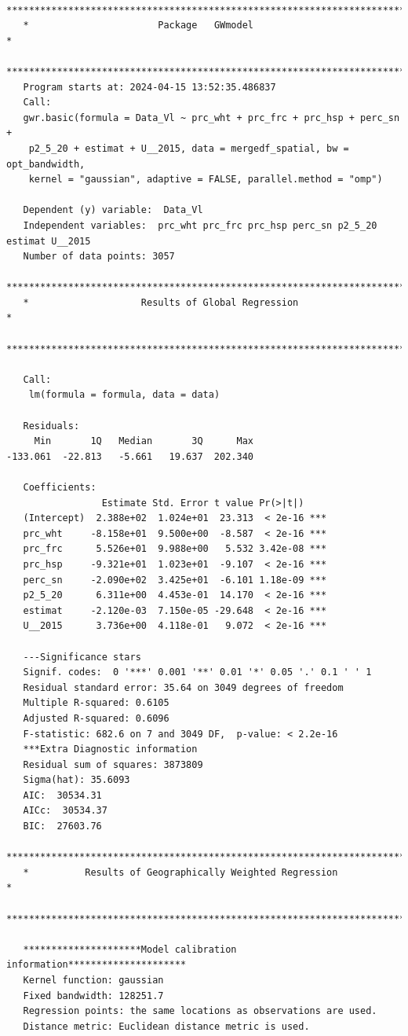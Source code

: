 \documentclass[
]{article}
\begin{document}
\begin{verbatim}
   ***********************************************************************
   *                       Package   GWmodel                             *
   ***********************************************************************
   Program starts at: 2024-04-15 13:52:35.486837 
   Call:
   gwr.basic(formula = Data_Vl ~ prc_wht + prc_frc + prc_hsp + perc_sn + 
    p2_5_20 + estimat + U__2015, data = mergedf_spatial, bw = opt_bandwidth, 
    kernel = "gaussian", adaptive = FALSE, parallel.method = "omp")

   Dependent (y) variable:  Data_Vl
   Independent variables:  prc_wht prc_frc prc_hsp perc_sn p2_5_20 estimat U__2015
   Number of data points: 3057
   ***********************************************************************
   *                    Results of Global Regression                     *
   ***********************************************************************

   Call:
    lm(formula = formula, data = data)

   Residuals:
     Min       1Q   Median       3Q      Max 
-133.061  -22.813   -5.661   19.637  202.340 

   Coefficients:
                 Estimate Std. Error t value Pr(>|t|)    
   (Intercept)  2.388e+02  1.024e+01  23.313  < 2e-16 ***
   prc_wht     -8.158e+01  9.500e+00  -8.587  < 2e-16 ***
   prc_frc      5.526e+01  9.988e+00   5.532 3.42e-08 ***
   prc_hsp     -9.321e+01  1.023e+01  -9.107  < 2e-16 ***
   perc_sn     -2.090e+02  3.425e+01  -6.101 1.18e-09 ***
   p2_5_20      6.311e+00  4.453e-01  14.170  < 2e-16 ***
   estimat     -2.120e-03  7.150e-05 -29.648  < 2e-16 ***
   U__2015      3.736e+00  4.118e-01   9.072  < 2e-16 ***

   ---Significance stars
   Signif. codes:  0 '***' 0.001 '**' 0.01 '*' 0.05 '.' 0.1 ' ' 1 
   Residual standard error: 35.64 on 3049 degrees of freedom
   Multiple R-squared: 0.6105
   Adjusted R-squared: 0.6096 
   F-statistic: 682.6 on 7 and 3049 DF,  p-value: < 2.2e-16 
   ***Extra Diagnostic information
   Residual sum of squares: 3873809
   Sigma(hat): 35.6093
   AIC:  30534.31
   AICc:  30534.37
   BIC:  27603.76
   ***********************************************************************
   *          Results of Geographically Weighted Regression              *
   ***********************************************************************

   *********************Model calibration information*********************
   Kernel function: gaussian 
   Fixed bandwidth: 128251.7 
   Regression points: the same locations as observations are used.
   Distance metric: Euclidean distance metric is used.


\end{verbatim}
\end{document}
